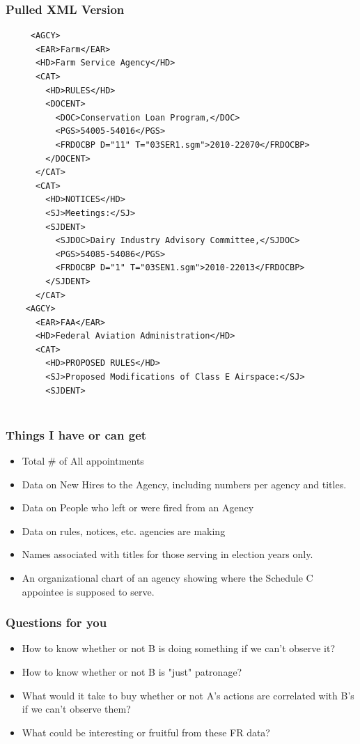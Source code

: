 \documentclass{beamer}
\begin{document}
\begin{frame}[fragile]
\frametitle{Pulled XML Version}
\scriptsize
\begin{verbatim}
     <AGCY>
      <EAR>Farm</EAR>
      <HD>Farm Service Agency</HD>
      <CAT>
        <HD>RULES</HD>
        <DOCENT>
          <DOC>Conservation Loan Program,</DOC>
          <PGS>54005-54016</PGS>
          <FRDOCBP D="11" T="03SER1.sgm">2010-22070</FRDOCBP>
        </DOCENT>
      </CAT>
      <CAT>
        <HD>NOTICES</HD>
        <SJ>Meetings:</SJ>
        <SJDENT>
          <SJDOC>Dairy Industry Advisory Committee,</SJDOC>
          <PGS>54085-54086</PGS>
          <FRDOCBP D="1" T="03SEN1.sgm">2010-22013</FRDOCBP>
        </SJDENT>
      </CAT>
    <AGCY>
      <EAR>FAA</EAR>
      <HD>Federal Aviation Administration</HD>
      <CAT>
        <HD>PROPOSED RULES</HD>
        <SJ>Proposed Modifications of Class E Airspace:</SJ>
        <SJDENT>
  
\end{verbatim}
\end{frame}

\begin{frame}
\frametitle {Things I have or can get}
\begin{itemize} \addtolength{\itemsep}{1\baselineskip}
\item Total # of All appointments
\item Data on New Hires to the Agency, including numbers per agency and titles.
\item Data on People who left or were fired from an Agency
\item Data on rules, notices, etc. agencies are making
\item Names associated with titles for those serving in election years only.
\item An organizational chart of an agency showing where the Schedule C appointee is supposed to serve.
\end{itemize}
\end{frame}

\begin{frame}
\frametitle{Questions for you}
\begin{itemize} \addtolength{\itemsep}{1\baselineskip}
\item How to know whether or not B is doing something if we can't observe it?
\item How to know whether or not B is "just" patronage?
\item What would it take to buy whether or not A's actions are correlated with B's if we can't observe them?
\item What could be interesting or fruitful from these FR data? 
\end{itemize}
\end{frame}
\end{document}

